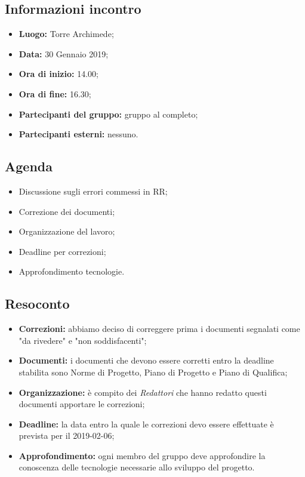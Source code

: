 \subsection{Informazioni incontro}
\begin{itemize}
	\item { \textbf{Luogo:} Torre Archimede};
	\item { \textbf{Data:} 30 Gennaio 2019};
	\item { \textbf{Ora di inizio:} 14.00};
	\item { \textbf{Ora di fine:} 16.30};
	\item { \textbf{Partecipanti del gruppo:} gruppo al completo};
	\item { \textbf{Partecipanti esterni:} nessuno}.
\end{itemize}


\subsection{Agenda}
\begin{itemize}
	\item {Discussione sugli errori commessi in RR;}
	\item {Correzione dei documenti;}
	\item {Organizzazione del lavoro;}
	\item {Deadline per correzioni;}
	\item {Approfondimento tecnologie.}
\end{itemize}

\subsection{Resoconto}
\begin{itemize}
	\item { \textbf{Correzioni:} abbiamo deciso di correggere prima i documenti segnalati come "da rivedere" e "non soddisfacenti";}
	\item{ \textbf{Documenti:} i documenti che devono essere corretti entro la deadline stabilita sono Norme di Progetto, Piano di Progetto e Piano di Qualifica;}
	\item { \textbf{Organizzazione:} è compito dei \emph{Redattori} che hanno redatto questi documenti apportare le correzioni; }	
	\item { \textbf{Deadline:} la data entro la quale le correzioni devo essere effettuate è prevista per il 2019-02-06;}
	\item { \textbf{Approfondimento:} ogni membro del gruppo deve approfondire la conoscenza delle tecnologie necessarie allo sviluppo del progetto.}
\end{itemize}


